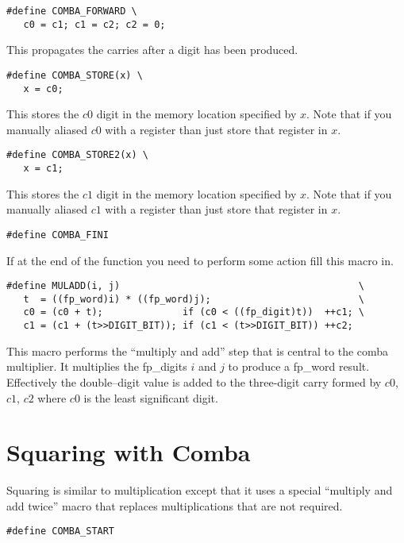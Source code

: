 \documentclass[b5paper]{book}
\begin{document}
\begin{verbatim}
#define COMBA_FORWARD \
   c0 = c1; c1 = c2; c2 = 0;
\end{verbatim}

This propagates the carries after a digit has been produced.  

\begin{verbatim}
#define COMBA_STORE(x) \
   x = c0;
\end{verbatim}

This stores the $c0$ digit in the memory location specified by $x$.  Note that if you manually 
aliased $c0$ with a register than just store that register in $x$.  

\begin{verbatim}
#define COMBA_STORE2(x) \
   x = c1;
\end{verbatim}

This stores the $c1$ digit in the memory location specified by $x$.  Note that if you manually 
aliased $c1$ with a register than just store that register in $x$.  

\begin{verbatim}
#define COMBA_FINI
\end{verbatim}

If at the end of the function you need to perform some action fill this macro in. 

\begin{verbatim}
#define MULADD(i, j)                                          \
   t  = ((fp_word)i) * ((fp_word)j);                          \
   c0 = (c0 + t);              if (c0 < ((fp_digit)t))  ++c1; \
   c1 = (c1 + (t>>DIGIT_BIT)); if (c1 < (t>>DIGIT_BIT)) ++c2;
\end{verbatim}

This macro performs the ``multiply and add'' step that is central to the comba
multiplier.  It multiplies the fp\_digits $i$ and $j$ to produce a fp\_word result.  Effectively
the double--digit value is added to the three-digit carry formed by $c0$, $c1$, $c2$ where $c0$
is the least significant digit.

\section{Squaring with Comba}
Squaring is similar to multiplication except that it uses a special ``multiply and add twice'' macro
that replaces multiplications that are not required.

\begin{verbatim}
#define COMBA_START
\end{verbatim}
\end{document}

